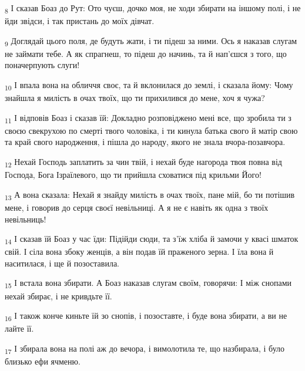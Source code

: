 \begin{tcolorbox}
\textsubscript{8} І сказав Боаз до Рут: Ото чуєш, дочко моя, не ходи збирати на іншому полі, і не йди звідси, і так пристань до моїх дівчат.
\end{tcolorbox}
\begin{tcolorbox}
\textsubscript{9} Доглядай цього поля, де будуть жати, і ти підеш за ними. Ось я наказав слугам не займати тебе. А як спрагнеш, то підеш до начинь, та й нап'єшся з того, що поначерпують слуги!
\end{tcolorbox}
\begin{tcolorbox}
\textsubscript{10} І впала вона на обличчя своє, та й вклонилася до землі, і сказала йому: Чому знайшла я милість в очах твоїх, що ти прихилився до мене, хоч я чужа?
\end{tcolorbox}
\begin{tcolorbox}
\textsubscript{11} І відповів Боаз і сказав їй: Докладно розповіджено мені все, що зробила ти з своєю свекрухою по смерті твого чоловіка, і ти кинула батька свого й матір свою та край свого народження, і пішла до народу, якого не знала вчора-позавчора.
\end{tcolorbox}
\begin{tcolorbox}
\textsubscript{12} Нехай Господь заплатить за чин твій, і нехай буде нагорода твоя повна від Господа, Бога Ізраїлевого, що ти прийшла сховатися під крильми Його!
\end{tcolorbox}
\begin{tcolorbox}
\textsubscript{13} А вона сказала: Нехай я знайду милість в очах твоїх, пане мій, бо ти потішив мене, і говорив до серця своєї невільниці. А я не є навіть як одна з твоїх невільниць!
\end{tcolorbox}
\begin{tcolorbox}
\textsubscript{14} І сказав їй Боаз у час їди: Підійди сюди, та з'їж хліба й замочи у квасі шматок свій. І сіла вона збоку женців, а він подав їй праженого зерна. І їла вона й наситилася, і ще й позоставила.
\end{tcolorbox}
\begin{tcolorbox}
\textsubscript{15} І встала вона збирати. А Боаз наказав слугам своїм, говорячи: І між снопами нехай збирає, і не кривдьте її.
\end{tcolorbox}
\begin{tcolorbox}
\textsubscript{16} І також конче киньте їй зо снопів, і позоставте, і буде вона збирати, а ви не лайте її.
\end{tcolorbox}
\begin{tcolorbox}
\textsubscript{17} І збирала вона на полі аж до вечора, і вимолотила те, що назбирала, і було близько ефи ячменю.
\end{tcolorbox}
